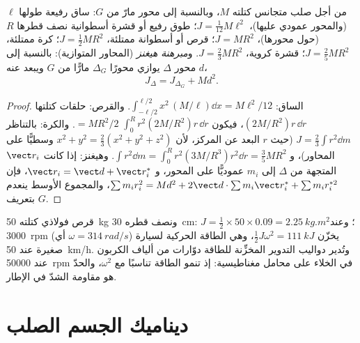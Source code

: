 \begin{proposition}\label{prop:b2:rigid-body-mechanics:inertia}
من أجل صلب متجانس كتلته $M$، وبالنسبة إلى محور مارّ من $G$: ساق
رفيعة طولها $\ell$ (والمحور عمودي عليها)، $J = \tfrac1{12}M\ell^2$؛ طوق
رفيع أو قشرة أسطوانية نصف قطرها $R$ (حول محورها)، $J = MR^2$؛ قرص
أو أسطوانة ممتلئة، $J = \tfrac12MR^2$؛ كرة ممتلئة، $J = \tfrac25MR^2$؛
قشرة كروية، $J = \tfrac23MR^2$. و\emph{مبرهنة هيغنز} (المحاور
المتوازية): بالنسبة إلى محور $\Delta$ يوازي محورًا $\Delta_G$ مارًّا
من $G$ ويبعد عنه
$d$،
\[
J_\Delta = J_{\Delta_G} + Md^2 .
\]
\end{proposition}

\begin{proof}
الساق: $\int_{-\ell/2}^{\ell/2}x^2\,(M/\ell)\dd x = M\ell^2/12$. والقرص:
حلقات كتلتها $(2M/R^2)r\,\dd r$، فيكون $\int_0^R r^2(2M/R^2)r\,\dd r$ $= MR^2/2$.
والكرة: بالتناظر $J = \tfrac23\int r^2\dd m$ (حيث $r$ البعد عن المركز،
لأن $x^2 + y^2 = \tfrac23(x^2 + y^2 + z^2)$ وسطيًّا على المحاور)،
و $\int r^2\dd m = \int_0^R r^2(3M/R^3)r^2\dd r = \tfrac35MR^2$. وهيغنز: إذا
كانت $\vect r_i$ المتجهة من $\Delta$ إلى $m_i$ عموديًّا على المحور،
و $\vect r_i = \vect d + \vect r_i^*$، فإن $\sum m_ir_i^2 = Md^2
+ 2\vect d\cdot\sum m_i\vect r_i^* + \sum m_ir_i^{*2}$، والمجموع الأوسط
ينعدم بتعريف $G$.
\end{proof}

\begin{example}\label{ex:b2:rigid-body-mechanics:flywheel}
قرص فولاذي كتلته \qty{50}{kg} ونصف قطره \qty{30}{cm}: $J = \tfrac12 \times
50 \times 0.09 = \qty{2.25}{kg.m^2}$؛ وعند \qty{3000}{rpm} (أي $\omega =
\qty{314}{rad/s}$) يخزّن $\tfrac12J\omega^2 = \qty{111}{kJ}$، وهي الطاقة
الحركية لسيارة صغيرة عند \qty{50}{km/h}. وتُدير دواليب التدوير
المخزِّنة للطاقة دوّارات من ألياف الكربون عند \qty{50000}{rpm} في
الخلاء على محامل مغناطيسية: إذ تنمو الطاقة تناسبًا مع $\omega^2$،
والحدّ هو مقاومة الشدّ في الإطار.
\end{example}

\section{ديناميك الجسم الصلب}

